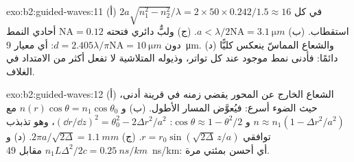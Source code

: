 \begin{solution}{exo:b2:guided-waves:11}
(أ) $2a\sqrt{n_1^2 - n_2^2}/\lambda = 2 \times 50 \times 0.242/1.5 \approx 16$ في كل استقطاب.
(ب) $a < \lambda/2\mathrm{NA} = \qty{3.1}{\micro m}$. (ج) ولبٌّ دائري فتحته $\mathrm{NA} =
0.12$ أحادي النمط دون $d = 2.405\lambda/\pi\mathrm{NA} = \qty{10}{\micro m}$: أي
معيار \qty{9}{\micro m}. (د) والشعاع المماسّ ينعكس كليًّا دائمًا: فأدنى
نمط موجود عند كل تواتر، وذيوله المتلاشية لا تفعل أكثر من
الامتداد في الغلاف.
\end{solution}

\begin{solution}{exo:b2:guided-waves:12}
(أ) الشعاع الخارج عن المحور يقضي زمنه في قرينة أدنى، حيث الضوء
أسرع: فيُعوَّض المسار الأطول. (ب) و $n(r)\cos\theta = n_1\cos\theta_0$
مع $n \approx n_1(1 - \Delta r^2/a^2)$ و $\cos\theta \approx 1 - \theta^2/2$: $(\dd r/\dd z)^2 =
\theta_0^2 - 2\Delta r^2/a^2$، وهو تذبذب توافقي $r = r_0\sin(\sqrt{2\Delta}\,z/a)$.
(ج) $2\pi a/\sqrt{2\Delta} = \qty{1.1}{mm}$. (د) و $n_1L\Delta^2/2c = \qty{0.25}{ns/km}$ مقابل
\qty{49}{ns/km}: أي أحسن بمئتي مرة.
\end{solution}


